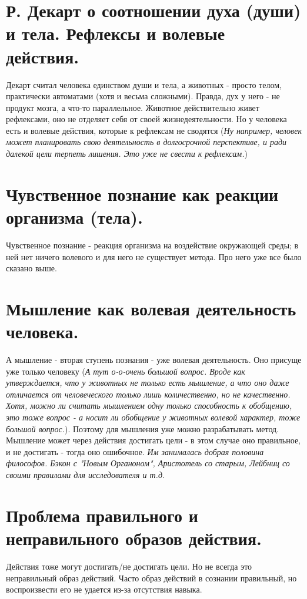 \section{ Р. Декарт о соотношении духа (души) и тела. Рефлексы и волевые действия.}
Декарт считал человека единством души и тела, а животных - просто телом, практически автоматами (хотя и весьма сложными). Правда, дух у него - не продукт мозга, а что-то параллельное. Животное действительно живет рефлексами, оно не отделяет себя от своей жизнедеятельности. Но у человека есть и волевые действия, которые к рефлексам не сводятся (\textit{Ну например, человек может планировать свою деятельность в долгосрочной перспективе, и ради далекой цели терпеть лишения. Это уже не свести к рефлексам.})

\section{ Чувственное познание как реакции организма (тела).}
Чувственное познание - реакция организма на воздействие окружающей среды; в ней нет ничего волевого и для него не существует метода. Про него уже все было сказано выше.

\section{ Мышление как волевая деятельность человека.}
А мышление - вторая ступень познания - уже волевая деятельность. Оно присуще уже только человеку (\textit{А тут о-о-очень большой вопрос. Вроде как утверждается, что у животных не только есть мышление, а что оно даже отличается от человеческого только лишь количественно, но не качественно. Хотя, можно ли считать мышлением одну только способность к обобщению, это тоже вопрос - а носит ли обобщение у животных волевой характер, тоже большой вопрос.}). Поэтому для мышления уже можно разрабатывать метод. Мышление может через действия достигать цели - в этом случае оно правильное, и не достигать - тогда оно ошибочное. \textit{Им занималась добрая половина философов. Бэкон с "Новым Органоном", Аристотель со старым, Лейбниц со своими правилами для исследователя и т.д.}

\section{ Проблема правильного и неправильного образов действия.}
Действия тоже могут достигать/не достигать цели. Но не всегда это неправильный образ действий. Часто образ действий в сознании правильный, но воспроизвести его не удается из-за отсутствия навыка.

